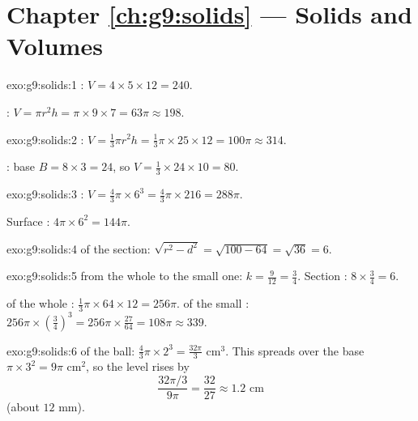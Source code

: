 \section*{Chapter \ref{ch:g9:solids} --- Solids and Volumes}

\begin{solution}{exo:g9:solids:1}
: $V = 4 \times 5 \times 12 = 240$.

: $V = \pi r^2 h = \pi \times 9 \times 7 = 63\pi \approx 198$.
\end{solution}

\begin{solution}{exo:g9:solids:2}
: $V = \frac13 \pi r^2 h = \frac13 \pi \times 25 \times 12 =
100\pi \approx 314$.

: base  $B = 8 \times 3 = 24$, so
$V = \frac13 \times 24 \times 10 = 80$.
\end{solution}

\begin{solution}{exo:g9:solids:3}
: $V = \frac43 \pi \times 6^3 = \frac43 \pi \times 216 = 288\pi$.

Surface : $4\pi \times 6^2 = 144\pi$.
\end{solution}

\begin{solution}{exo:g9:solids:4}
 of the section: $\sqrt{r^2 - d^2} = \sqrt{100 - 64} = \sqrt{36}
= 6$.
\end{solution}

\begin{solution}{exo:g9:solids:5}
 from the whole  to the small one:
$k = \frac{9}{12} = \frac34$. Section : $8 \times \frac34 = 6$.

 of the whole : $\frac13\pi \times 64 \times 12 = 256\pi$.
 of the small : $256\pi \times \left(\frac34\right)^3 =
256\pi \times \frac{27}{64} = 108\pi \approx 339$.
\end{solution}

\begin{solution}{exo:g9:solids:6}
 of the ball: $\frac43\pi \times 2^3 = \frac{32\pi}{3}$ cm$^3$.
This  spreads over the base  $\pi \times 3^2 = 9\pi$ cm$^2$,
so the level rises by
\[
\frac{32\pi/3}{9\pi} = \frac{32}{27} \approx 1.2 \text{ cm}
\]
(about $12$ mm).
\end{solution}

